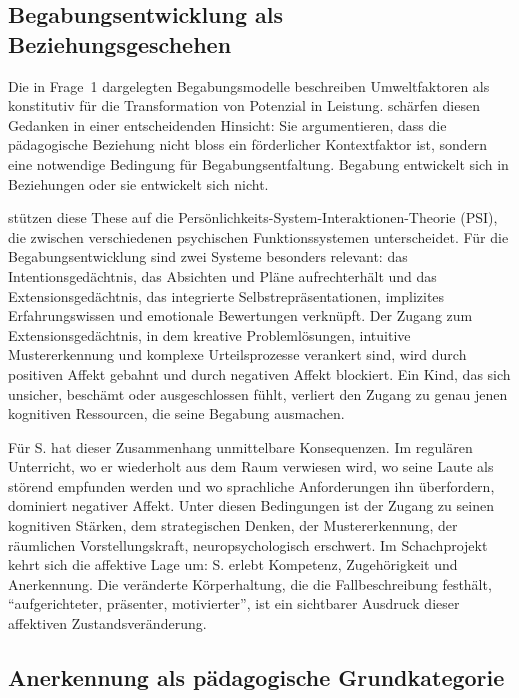 \documentclass[ngerman, a4paper]{article}
\begin{document}
\subsection{Begabungsentwicklung als Beziehungsgeschehen}

Die in Frage~1 dargelegten Begabungsmodelle beschreiben Umweltfaktoren als
konstitutiv für die Transformation von Potenzial in Leistung. \textcite[S.\,35--57]{kuhl2019diversitaet}
schärfen diesen Gedanken in einer entscheidenden Hinsicht: Sie argumentieren, dass
die pädagogische Beziehung nicht bloss ein förderlicher Kontextfaktor ist, sondern
eine notwendige Bedingung für Begabungsentfaltung. Begabung entwickelt sich in
Beziehungen oder sie entwickelt sich nicht.

\textcite[S.\,35--57]{kuhl2019diversitaet} stützen diese These auf die Persönlichkeits-System-Interaktionen-Theorie (PSI),
die zwischen verschiedenen psychischen Funktionssystemen unterscheidet. Für die
Begabungsentwicklung sind zwei Systeme besonders relevant: das Intentionsgedächtnis,
das Absichten und Pläne aufrechterhält und das Extensionsgedächtnis, das integrierte
Selbstrepräsentationen, implizites Erfahrungswissen und emotionale Bewertungen
verknüpft. Der Zugang zum Extensionsgedächtnis, in dem kreative Problemlösungen,
intuitive Mustererkennung und komplexe Urteilsprozesse verankert sind, wird durch
positiven Affekt gebahnt und durch negativen Affekt blockiert. Ein Kind, das sich
unsicher, beschämt oder ausgeschlossen fühlt, verliert den Zugang zu genau jenen
kognitiven Ressourcen, die seine Begabung ausmachen.

Für S. hat dieser Zusammenhang unmittelbare Konsequenzen. Im regulären Unterricht,
wo er wiederholt aus dem Raum verwiesen wird, wo seine Laute als störend empfunden
werden und wo sprachliche Anforderungen ihn überfordern, dominiert negativer Affekt.
Unter diesen Bedingungen ist der Zugang zu seinen kognitiven Stärken, dem
strategischen Denken, der Mustererkennung, der räumlichen Vorstellungskraft,
neuropsychologisch erschwert. Im Schachprojekt kehrt sich die affektive Lage um:
S. erlebt Kompetenz, Zugehörigkeit und Anerkennung. Die veränderte Körperhaltung,
die die Fallbeschreibung festhält, \enquote{aufgerichteter, präsenter, motivierter},
ist ein sichtbarer Ausdruck dieser affektiven Zustandsveränderung.

\subsection{Anerkennung als pädagogische Grundkategorie}
\end{document}
